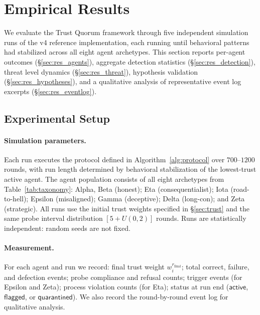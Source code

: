 \section{Empirical Results}
\label{sec:results}

We evaluate the Trust Quorum framework through five independent simulation runs of the
v4 reference implementation, each running until behavioral patterns had stabilized across
all eight agent archetypes.  This section reports per-agent outcomes
(\S\ref{sec:res_agents}), aggregate detection statistics (\S\ref{sec:res_detection}),
threat level dynamics (\S\ref{sec:res_threat}), hypothesis validation
(\S\ref{sec:res_hypotheses}), and a qualitative analysis of representative event log
excerpts (\S\ref{sec:res_eventlog}).

\subsection{Experimental Setup}
\label{sec:res_setup}

\paragraph{Simulation parameters.}
Each run executes the protocol defined in Algorithm~\ref{alg:protocol} over
$700$--$1200$ rounds, with run length determined by behavioral stabilization of the
lowest-trust active agent.  The agent population consists of all eight archetypes from
Table~\ref{tab:taxonomy}: Alpha, Beta (honest); Eta (consequentialist); Iota
(road-to-hell); Epsilon (misaligned); Gamma (deceptive); Delta (long-con); and Zeta
(strategic).  All runs use the initial trust weights specified in \S\ref{sec:trust} and
the same probe interval distribution $[5 + U(0,2)]$ rounds.  Runs are statistically
independent: random seeds are not fixed.

\paragraph{Measurement.}
For each agent and run we record: final trust weight $w_i^{r_\text{final}}$; total
correct, failure, and defection events; probe compliance and refusal counts; trigger
events (for Epsilon and Zeta); process violation counts (for Eta); status at run end
($\mathsf{active}$, $\mathsf{flagged}$, or $\mathsf{quarantined}$).  We also record
the round-by-round event log for qualitative analysis.

